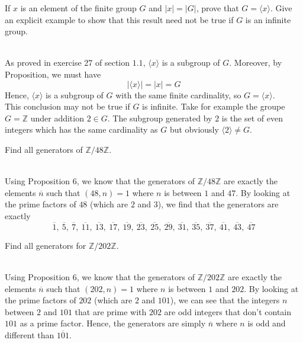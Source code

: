 \begin{exercise}
    If $x$ is an element of the finite group $G$ and $|x|=|G|$, prove that
    $G=\langle x\rangle$. Give an explicit example to show that this result
    need not be true if $G$ is an infinite group.\\
\end{exercise}

\begin{solution}
    \\ As proved in exercise 27 of section $1.1$, $\langle x\rangle$ is a
    subgroup of $G$. Moreover, by Proposition, we must have
    $$|\langle x\rangle|=|x|=G$$
    Hence, $\langle x\rangle$ is a subgroup of $G$ with the same finite
    cardinality, so $G=\langle x\rangle$.\\
    This conclusion may not be true if $G$ is infinite. Take for example
    the groupe $G=\mathbb{Z}$ under addition $2\in G$. The subgroup
    generated by $2$ is the set of even integers which has the same
    cardinality as $G$ but obviously $\langle 2\rangle\neq G$.\\
\end{solution}

\begin{exercise}
    Find all generators of $\mathbb{Z}/48\mathbb{Z}$.\\
\end{exercise}

\begin{solution}
    \\Using Proposition $6$, we know that the generators of
    $\mathbb{Z}/48\mathbb{Z}$ are exactly the elements $\overline{n}$
    such that $(48,n)=1$ where $n$ is between $1$ and $47$. By looking
    at the prime factors of $48$ (which are $2$ and $3$), we find that
    the generators are exactly
    $$\overline{1},\ \overline{5},\ \overline{7},\ \overline{11},\
    \overline{13},\ \overline{17},\ \overline{19},\ \overline{23},\
    \overline{25},\ \overline{29},\ \overline{31},\ \overline{35},\
    \overline{37},\ \overline{41},\ \overline{43},\ \overline{47}$$
\end{solution}

\begin{exercise}
    Find all generators for $\mathbb{Z}/202\mathbb{Z}$.\\
\end{exercise}

\begin{solution}
    \\Using Proposition $6$, we know that the generators of
    $\mathbb{Z}/202\mathbb{Z}$ are exactly the elements $\overline{n}$
    such that $(202,n)=1$ where $n$ is between $1$ and $202$. By looking
    at the prime factors of $202$ (which are $2$ and $101$), we can see
    that the integers $n$ between $2$ and $101$ that are prime with $202$
    are odd integers that don't contain $101$ as a prime factor. Hence, the
    generators are simply $\overline{n}$ where $n$ is odd and different than
    $\overline{101}$.\\
\end{solution}

